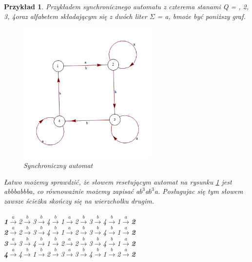 \documentclass[12pt,a4paper]{article}
\newtheorem{pr}{Przyk{\l}ad}[section]
\begin{document}
\begin{pr}
Przyk{\l}adem synchronicznego automatu z czterema stanami Q = , 2, 3, 4\textbraceright  oraz alfabetem sk{\l}adaj\k{a}cym si\k{e} z dw\'{o}ch liter $\Sigma$ = \textbraceleft a, b\textbraceright  mo\.{z}e by\'c poni\.{z}szy graf.
\begin{figure}[H]
    \centering
    \includegraphics[width=0.62\textwidth]{rysunek1}
    \caption{Synchroniczny automat}
    \label{fig:rysunek1}
\end{figure}

{\L}atwo mo\.{z}emy sprawdzi\'{c}, \.{z}e s{\l}owem resetuj\k{a}cym automat na rysunku \ref{fig:rysunek1} jest \textit{abbbabbba}, co r\'{o}wnowa\.{z}nie mo\.{z}emy zapisa\'{c} \textit{a$b^{3}$a$b^{3}$a}. Pos{\l}ugujac si\k{e} tym s{\l}owem zawsze \'{s}cie\.{z}ka sko\'{n}czy si\k{e} na wierzcho{\l}ku drugim.\\
\\
\textbf{1}$\xrightarrow{a}$2$\xrightarrow{b}$3$\xrightarrow{b}$4$\xrightarrow{b}$1$\xrightarrow{a}$2$\xrightarrow{b}$3$\xrightarrow{b}$4$\xrightarrow{b}$1$\xrightarrow{a}$\textbf{2}\\
\textbf{2}$\xrightarrow{a}$2$\xrightarrow{b}$3$\xrightarrow{b}$4$\xrightarrow{b}$1$\xrightarrow{a}$2$\xrightarrow{b}$3$\xrightarrow{b}$4$\xrightarrow{b}$1$\xrightarrow{a}$\textbf{2}\\
\textbf{3}$\xrightarrow{a}$3$\xrightarrow{b}$4$\xrightarrow{b}$1$\xrightarrow{b}$2$\xrightarrow{a}$2$\xrightarrow{b}$3$\xrightarrow{b}$4$\xrightarrow{b}$1$\xrightarrow{a}$\textbf{2}\\
\textbf{4}$\xrightarrow{a}$4$\xrightarrow{b}$1$\xrightarrow{b}$2$\xrightarrow{b}$3$\xrightarrow{a}$3$\xrightarrow{b}$4$\xrightarrow{b}$1$\xrightarrow{b}$2$\xrightarrow{a}$\textbf{2}
\end{pr}
\end{document}
